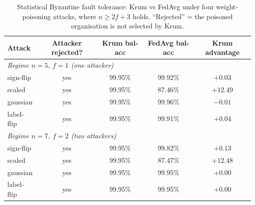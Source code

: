 \begin{table}[H]
\centering
\caption{Statistical Byzantine fault tolerance: Krum vs FedAvg under four weight-poisoning attacks, where $n\ge 2f+3$ holds. ``Rejected'' = the poisoned organisation is not selected by Krum.}
\label{tab:byzantine_robustness}
\small\setlength{\tabcolsep}{4pt}
\begin{tabular}{|l|c|c|c|c|}
\hline
Attack & Attacker rejected? & Krum bal-acc & FedAvg bal-acc & Krum advantage \\ \hline
\multicolumn{5}{|l|}{\emph{Regime $n=5,\ f=1$ (one attacker)}} \\ \hline
sign-flip  & yes & 99.95\% & 99.92\% & $+0.03$ \\ \hline
scaled     & yes & 99.95\% & 87.46\% & $+12.49$ \\ \hline
gaussian   & yes & 99.95\% & 99.96\% & $-0.01$ \\ \hline
label-flip & yes & 99.95\% & 99.91\% & $+0.04$ \\ \hline
\multicolumn{5}{|l|}{\emph{Regime $n=7,\ f=2$ (two attackers)}} \\ \hline
sign-flip  & yes & 99.95\% & 99.82\% & $+0.13$ \\ \hline
scaled     & yes & 99.95\% & 87.47\% & $+12.48$ \\ \hline
gaussian   & yes & 99.95\% & 99.95\% & $+0.00$ \\ \hline
label-flip & yes & 99.95\% & 99.95\% & $+0.00$ \\ \hline
\end{tabular}
\end{table}

